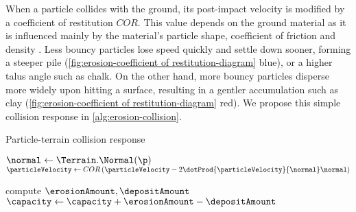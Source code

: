 When a particle collides with the ground, its post-impact velocity is modified by a coefficient of restitution $COR$. This value depends on the ground material as it is influenced mainly by the material's particle shape, coefficient of friction and density \cite{Yan2020}. Less bouncy particles lose speed quickly and settle down sooner, forming a steeper pile (\cref{fig:erosion-coefficient of restitution-diagram} blue), or a higher talus angle such as chalk. On the other hand, more bouncy particles disperse more widely upon hitting a surface, resulting in a gentler accumulation such as clay (\cref{fig:erosion-coefficient of restitution-diagram} red). We propose this simple collision response in \cref{alg:erosion-collision}. 

\begin{algorithm}[H]
    \caption{Particle-terrain collision response}
    \label{alg:erosion-collision}
    \DontPrintSemicolon
    \BlankLine

    $\normal \gets \Terrain.\Normal(\p)$\;
    $\particleVelocity \gets COR \left(\particleVelocity - 2 \dotProd{\particleVelocity}{\normal} \normal\right)$ \;

    compute $\erosionAmount, \depositAmount$ 
    $\capacity \gets \capacity + \erosionAmount - \depositAmount$\;

    \Return{$(\particleVelocity,\capacity)$}
\end{algorithm}




